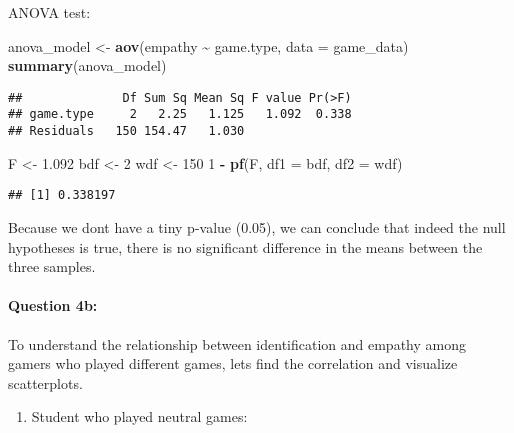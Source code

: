 \documentclass[
]{article}
\newenvironment{Shaded}{\begin{snugshade}}{\end{snugshade}}
\newcommand{\AttributeTok}[1]{\textcolor[rgb]{0.13,0.29,0.53}{#1}}
\newcommand{\DecValTok}[1]{\textcolor[rgb]{0.00,0.00,0.81}{#1}}
\newcommand{\FloatTok}[1]{\textcolor[rgb]{0.00,0.00,0.81}{#1}}
\newcommand{\FunctionTok}[1]{\textcolor[rgb]{0.13,0.29,0.53}{\textbf{#1}}}
\newcommand{\NormalTok}[1]{#1}
\newcommand{\OtherTok}[1]{\textcolor[rgb]{0.56,0.35,0.01}{#1}}
\newcommand{\SpecialCharTok}[1]{\textcolor[rgb]{0.81,0.36,0.00}{\textbf{#1}}}
\newcommand{\StringTok}[1]{\textcolor[rgb]{0.31,0.60,0.02}{#1}}
\providecommand{\tightlist}{%
  \setlength{\itemsep}{0pt}\setlength{\parskip}{0pt}}
\begin{document}
ANOVA test:

\begin{Shaded}
\begin{Highlighting}[]
\NormalTok{anova\_model }\OtherTok{\textless{}{-}} \FunctionTok{aov}\NormalTok{(empathy }\SpecialCharTok{\textasciitilde{}}\NormalTok{ game.type, }\AttributeTok{data =}\NormalTok{ game\_data)}
\FunctionTok{summary}\NormalTok{(anova\_model)}
\end{Highlighting}
\end{Shaded}

\begin{verbatim}
##              Df Sum Sq Mean Sq F value Pr(>F)
## game.type     2   2.25   1.125   1.092  0.338
## Residuals   150 154.47   1.030
\end{verbatim}

\begin{Shaded}
\begin{Highlighting}[]
\NormalTok{F }\OtherTok{\textless{}{-}} \FloatTok{1.092}
\NormalTok{bdf }\OtherTok{\textless{}{-}} \DecValTok{2}
\NormalTok{wdf }\OtherTok{\textless{}{-}} \DecValTok{150}
\DecValTok{1} \SpecialCharTok{{-}} \FunctionTok{pf}\NormalTok{(F, }\AttributeTok{df1 =}\NormalTok{ bdf, }\AttributeTok{df2 =}\NormalTok{ wdf)}
\end{Highlighting}
\end{Shaded}

\begin{verbatim}
## [1] 0.338197
\end{verbatim}

Because we dont have a tiny p-value (0.05), we can conclude that indeed
the null hypotheses is true, there is no significant difference in the
means between the three samples.

\hypertarget{question-4b}{%
\paragraph{Question 4b:}\label{question-4b}}

To understand the relationship between identification and empathy among
gamers who played different games, lets find the correlation and
visualize scatterplots.

\begin{enumerate}
\def\labelenumi{\roman{enumi}.}
\tightlist
\item
  Student who played neutral games:
\end{enumerate}

\begin{Shaded}
\end{Shaded}
\end{document}
